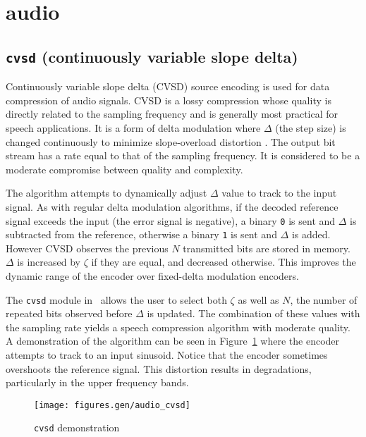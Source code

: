 % 
%

\newpage
\section{audio}
\label{module:audio}

\subsection{{\tt cvsd} (continuously variable slope delta)}
\label{module:audio:cvsd}
Continuously variable slope delta (CVSD) source encoding is used for data
compression of audio signals.
CVSD is a lossy compression whose quality is directly related to the sampling
frequency and is generally most practical for speech applications.
It is a form of delta modulation where $\Delta$ (the step size) is changed
continuously to minimize slope-overload distortion \cite[p. 131]{Proakis:2001}.
The output bit stream has a rate equal to that of the sampling frequency.
It is considered to be a moderate compromise between quality and complexity.

The algorithm attempts to dynamically adjust $\Delta$ value to track
to the input signal.
As with regular delta modulation algorithms,
if the decoded reference signal exceeds the input (the error signal is
negative), a binary {\tt 0} is sent and $\Delta$ is subtracted from the
reference, otherwise a binary {\tt 1} is sent and $\Delta$ is added.
However CVSD observes the previous $N$ transmitted bits are stored in memory.
$\Delta$ is increased by $\zeta$ if they are equal, and decreased otherwise.
This improves the dynamic range of the encoder over fixed-delta modulation
encoders.

The {\tt cvsd} module in \liquid\ allows the user to select both $\zeta$
as well as $N$, the number of repeated bits observed before $\Delta$ is
updated.
The combination of these values with the sampling rate yields a speech
compression algorithm with moderate quality.
A demonstration of the algorithm can be seen in
Figure~\ref{fig:module:audio:cvsd} where the encoder attempts to track to an
input sinusoid.
Notice that the encoder sometimes overshoots the reference signal.
This distortion results in degradations, particularly in the upper frequency
bands.

\begin{figure}
\centering
  \texttt{[image: figures.gen/audio\_cvsd]}
\caption{{\tt cvsd} demonstration}
\label{fig:module:audio:cvsd}
\end{figure}


